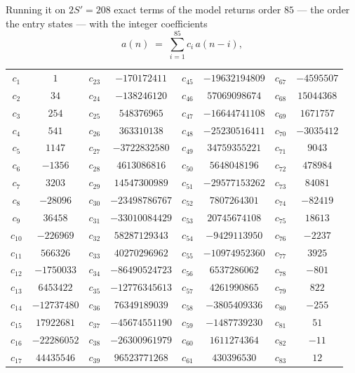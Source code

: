 \documentclass[11pt,a4paper]{article}
\theoremstyle{plain}
\theoremstyle{definition}
\begin{document}
Running it on $2S'=208$ exact terms of the model returns order $85$ --- the order the
entry states --- with the integer coefficients
\[
a(n)\;=\;\sum_{i=1}^{85}c_i\,a(n-i),
\]
\begin{center}\small
\begin{tabular}{cccccccc}
$c_{1}$ & $1$ & $c_{23}$ & $-170172411$ & $c_{45}$ & $-19632194809$ & $c_{67}$ & $-4595507$ \\
$c_{2}$ & $34$ & $c_{24}$ & $-138246120$ & $c_{46}$ & $57069098674$ & $c_{68}$ & $15044368$ \\
$c_{3}$ & $254$ & $c_{25}$ & $548376965$ & $c_{47}$ & $-16644741108$ & $c_{69}$ & $1671757$ \\
$c_{4}$ & $541$ & $c_{26}$ & $363310138$ & $c_{48}$ & $-25230516411$ & $c_{70}$ & $-3035412$ \\
$c_{5}$ & $1147$ & $c_{27}$ & $-3722832580$ & $c_{49}$ & $34759355221$ & $c_{71}$ & $9043$ \\
$c_{6}$ & $-1356$ & $c_{28}$ & $4613086816$ & $c_{50}$ & $5648048196$ & $c_{72}$ & $478984$ \\
$c_{7}$ & $3203$ & $c_{29}$ & $14547300989$ & $c_{51}$ & $-29577153262$ & $c_{73}$ & $84081$ \\
$c_{8}$ & $-28096$ & $c_{30}$ & $-23498786767$ & $c_{52}$ & $7807264301$ & $c_{74}$ & $-82419$ \\
$c_{9}$ & $36458$ & $c_{31}$ & $-33010084429$ & $c_{53}$ & $20745674108$ & $c_{75}$ & $18613$ \\
$c_{10}$ & $-226969$ & $c_{32}$ & $58287129343$ & $c_{54}$ & $-9429113950$ & $c_{76}$ & $-2237$ \\
$c_{11}$ & $566326$ & $c_{33}$ & $40270296962$ & $c_{55}$ & $-10974952360$ & $c_{77}$ & $3925$ \\
$c_{12}$ & $-1750033$ & $c_{34}$ & $-86490524723$ & $c_{56}$ & $6537286062$ & $c_{78}$ & $-801$ \\
$c_{13}$ & $6453422$ & $c_{35}$ & $-12776345613$ & $c_{57}$ & $4261990865$ & $c_{79}$ & $822$ \\
$c_{14}$ & $-12737480$ & $c_{36}$ & $76349189039$ & $c_{58}$ & $-3805409336$ & $c_{80}$ & $-255$ \\
$c_{15}$ & $17922681$ & $c_{37}$ & $-45674551190$ & $c_{59}$ & $-1487739230$ & $c_{81}$ & $51$ \\
$c_{16}$ & $-22286052$ & $c_{38}$ & $-26300961979$ & $c_{60}$ & $1611274364$ & $c_{82}$ & $-11$ \\
$c_{17}$ & $44435546$ & $c_{39}$ & $96523771268$ & $c_{61}$ & $430396530$ & $c_{83}$ & $12$ \\

\end{tabular}
\end{center}
\end{document}
